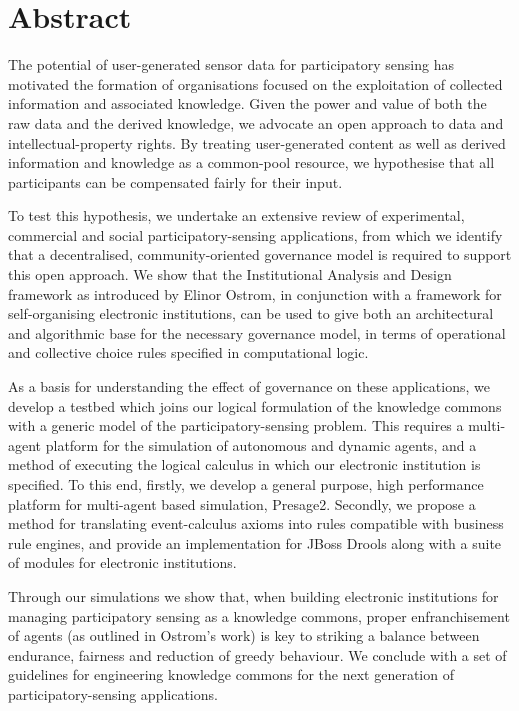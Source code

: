 \begingroup
\let\clearpage\relax
\let\cleardoublepage\relax
\let\cleardoublepage\relax

\chapter*{Abstract}

The potential of user-generated sensor data for participatory sensing has motivated the formation of organisations focused on the exploitation of collected information and associated knowledge. 
Given the power and value of both the raw data and the derived knowledge, we advocate an open approach to data and intellectual-property rights. By treating user-generated content as well as derived information and knowledge 
as a common-pool resource, we hypothesise that
all participants can be compensated fairly for their input.

To test this hypothesis, we undertake an extensive review of experimental, commercial and social participatory-sensing applications, from which we identify that a decentralised, community-oriented governance model is required
to support this open approach. We show that the Institutional Analysis and Design framework as introduced by Elinor Ostrom, in conjunction
with a framework for self-organising electronic institutions, can be used to give both an architectural
and algorithmic base for the necessary governance model, in terms of operational and collective choice rules
specified in computational logic.

As a basis for understanding the effect of governance on these applications, we develop a testbed which joins our logical formulation of the knowledge commons with a generic model of the participatory-sensing problem.
This requires a multi-agent platform for the simulation of autonomous and dynamic agents, and a method of executing the logical calculus in which our electronic institution is specified. 
To this end, firstly, we develop a general purpose, high performance platform for multi-agent based simulation, Presage2. 
Secondly, we propose a method for translating event-calculus axioms into rules compatible with business rule engines, and provide an implementation for JBoss Drools along with a suite of modules for electronic institutions.

Through our simulations we show that, when building electronic institutions for managing participatory sensing as a knowledge commons, proper enfranchisement of agents (as outlined in Ostrom's work) is key to striking a balance between endurance, fairness and reduction of greedy behaviour. We conclude with a set of guidelines for engineering knowledge commons for the next generation of participatory-sensing applications.

